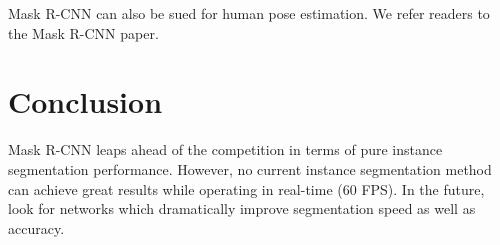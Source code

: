 \documentclass{article}
\begin{document}
Mask R-CNN can also be sued for human pose estimation. We refer readers to the Mask R-CNN paper.

\section{Conclusion}
Mask R-CNN leaps ahead of the competition in terms of pure instance segmentation performance. However, no current instance segmentation method can achieve great results while operating in real-time (60 FPS). In the future, look for networks which dramatically improve segmentation speed as well as accuracy.
\end{document}
